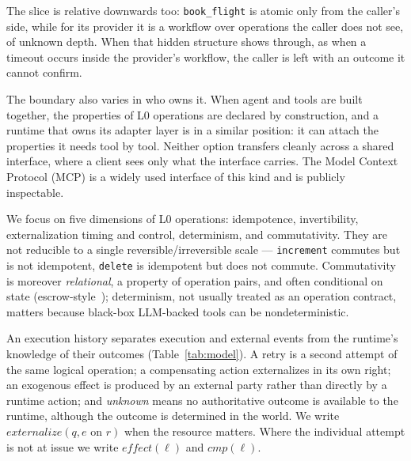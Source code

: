 \documentclass{article}
\begin{document}
The slice is relative downwards too: \texttt{book\_flight} is atomic only
from the caller's side, while for its provider it is a workflow over
operations the caller does not see, of unknown depth. When that hidden
structure shows through, as when a timeout occurs inside the provider's workflow, the caller is left with an outcome it cannot confirm.

The boundary also varies in who owns it. When agent and tools are built
together, the properties of L0 operations are declared by construction, and
a runtime that owns its adapter layer is in a similar position: it can
attach the properties it needs tool by tool. Neither option transfers
cleanly across a shared interface, where a client sees only what the
interface carries. The Model Context Protocol
(MCP) is a widely used interface of this kind and is publicly inspectable.

We focus on five dimensions of L0 operations: idempotence, invertibility,
externalization timing and control, determinism, and commutativity. They are
not reducible to a single reversible/irreversible scale ---
\texttt{increment} commutes but is not idempotent, \texttt{delete} is
idempotent but does not commute. Commutativity is moreover
\emph{relational}, a property of operation pairs, and often conditional on
state (escrow-style~\cite{oneil1986escrow}); determinism, not usually
treated as an operation contract, matters because black-box LLM-backed tools
can be nondeterministic.

An execution history separates execution and external events from the
runtime's knowledge of their outcomes (Table~\ref{tab:model}). A retry is a second
attempt of the same logical operation; a compensating action externalizes in
its own right; an exogenous effect is produced by an external party rather
than directly by a runtime action; and \emph{unknown} means no
authoritative outcome is available to the runtime, although the outcome is
determined in the world. We write $externalize(q, e \text{ on } r)$ when the
resource matters. Where the individual attempt is not at issue we
write $effect(\ell)$ and $cmp(\ell)$.
\end{document}
